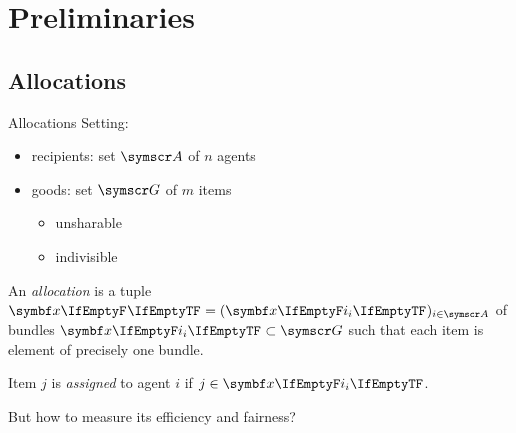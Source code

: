 \section{Preliminaries}

\subsection{Allocations}
\begin{frame}{Allocations}
	Setting:
	\begin{itemize}
		\item
		recipients: set \(\agents\) of \(n\) agents

		\item
		goods: set \(\goods\) of \(m\) items
		\begin{itemize}
			\item
			unsharable

			\item
			indivisible
		\end{itemize}
	\end{itemize}
	\begin{definition}[1]
		An \emph{allocation} is a tuple
		\(\alloc[][] = (\alloc)_{i \in \agents}\)
		of bundles \(\alloc \subset \goods\) such that each item is element of precisely one bundle.

		Item \(j\) is \emph{assigned} to agent \(i\) if \(j \in \alloc\).
	\end{definition}

	But how to measure its efficiency and fairness?
\end{frame}






